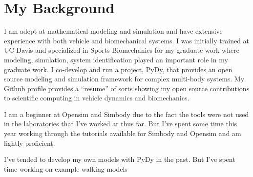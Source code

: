 \documentclass[11pt]{article}
\begin{document}
\section*{My Background}

I am adept at mathematical modeling and simulation and have extensive
experience with both vehicle and biomechanical systems. I was initially trained
at UC Davis and specialized in Sports Biomechanics for my graduate work where
modeling, simulation, system identification played an important role in my
graduate work. I co-develop and run a project, PyDy, that provides an open
source modeling and simulation framework for complex multi-body systems. My
Github profile provides a ``resume'' of sorts showing my open source
contributions to scientific computing in vehicle dynamics and biomechanics.

I am a beginner at Opensim and Simbody due to the fact the tools were not used
in the laboratories that I've worked at thus far. But I've spent some time
this year working through the tutorials available for Simbody and Opensim and
am lightly proficient.

I've tended to develop my own models with PyDy in the past. But I've spent
time working on example walking models



\end{document}
